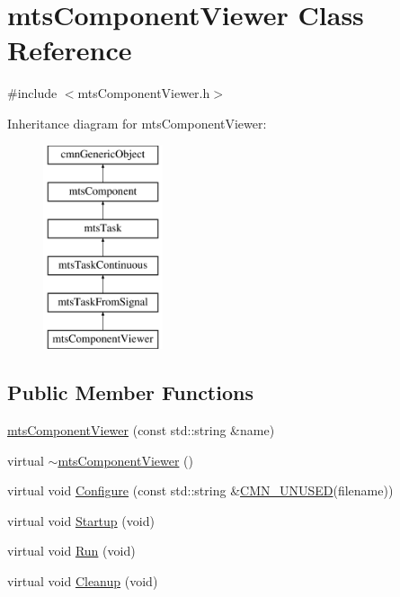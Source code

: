\hypertarget{classmts_component_viewer}{}\section{mts\+Component\+Viewer Class Reference}
\label{classmts_component_viewer}


{\ttfamily \#include $<$mts\+Component\+Viewer.\+h$>$}

Inheritance diagram for mts\+Component\+Viewer\+:\begin{figure}[H]
\begin{center}
\leavevmode
\includegraphics[height=6.000000cm]{d0/d6a/classmts_component_viewer}
\end{center}
\end{figure}
\subsection*{Public Member Functions}
\begin{DoxyCompactItemize}
\item 
\hyperlink{classmts_component_viewer_a0b50fd33fa1fcad2b06ad69cfa5450cb}{mts\+Component\+Viewer} (const std\+::string \&name)
\item 
virtual \hyperlink{classmts_component_viewer_a6bc182a4d81ab4c55b9a9ed7a2b50666}{$\sim$mts\+Component\+Viewer} ()
\item 
virtual void \hyperlink{classmts_component_viewer_af3c34464ddff5a8b5728fb414543a144}{Configure} (const std\+::string \&\hyperlink{cmn_portability_8h_a021894e2626935fa2305434b1e893ff6}{C\+M\+N\+\_\+\+U\+N\+U\+S\+E\+D}(filename))
\item 
virtual void \hyperlink{classmts_component_viewer_a425bc56d337aca711e8834126939762a}{Startup} (void)
\item 
virtual void \hyperlink{classmts_component_viewer_a4c3d8d11e6e2f187c1b8fdaef3b3c561}{Run} (void)
\item 
virtual void \hyperlink{classmts_component_viewer_aff0098569266c8804e07377551f627f9}{Cleanup} (void)
\end{DoxyCompactItemize}
